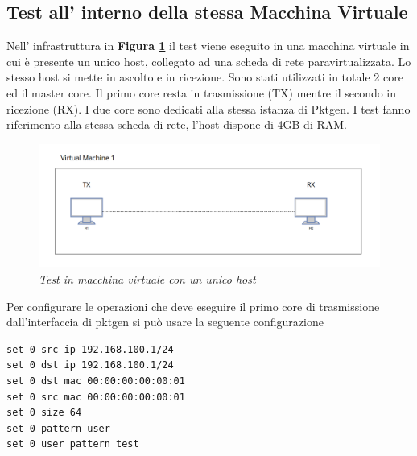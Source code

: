 \subsection*{Test all' interno della stessa Macchina Virtuale}
Nell' infrastruttura in \textbf{{Figura \ref{fig:dpdk_vm1}}} il test viene eseguito in una macchina virtuale in cui è presente un unico host, collegato ad una scheda di rete paravirtualizzata. Lo stesso host si mette in ascolto e in ricezione. Sono stati utilizzati in totale 2 core ed il master core.
Il primo core resta in trasmissione (TX) mentre il secondo in ricezione (RX). I due core sono dedicati alla stessa istanza di Pktgen. I test fanno riferimento alla stessa scheda di rete, l'host dispone di 4GB di RAM.
\FloatBarrier
\begin{figure}[h]
\includegraphics[scale=0.5]{images/dpdk_vm1.png}
\centering
\caption{\textit{Test in macchina virtuale con un unico host}}
\vspace{1cm}
\label{fig:dpdk_vm1}
\end{figure}
\FloatBarrier
\leavevmode\newline
Per configurare le operazioni che deve eseguire il primo core di trasmissione dall'interfaccia di pktgen si può usare la seguente configurazione
\begin{verbatim}
set 0 src ip 192.168.100.1/24
set 0 dst ip 192.168.100.1/24
set 0 dst mac 00:00:00:00:00:01
set 0 src mac 00:00:00:00:00:01
set 0 size 64
set 0 pattern user
set 0 user pattern test
\end{verbatim}

